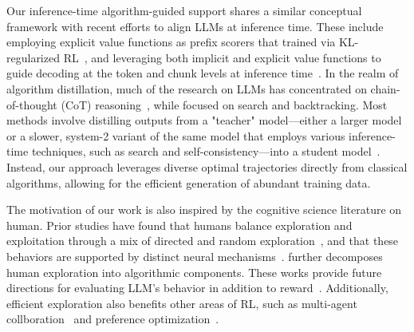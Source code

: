Our inference-time algorithm-guided support shares a similar conceptual framework with recent efforts to align LLMs at inference time. These include employing explicit value functions as prefix scorers that trained via KL-regularized RL~\citep{mudgal2023controlled}, and leveraging both implicit and explicit value functions to guide decoding at the token and chunk levels at inference time~\citep{liu2024inference}. 
In the realm of algorithm distillation, much of the research on LLMs has concentrated on chain-of-thought (CoT) reasoning~\citep{wang2023scott, li2023symbolic}, while \cite{gandhi2024stream} focused on search and backtracking. Most methods involve distilling outputs from a "teacher" model—either a larger model or a slower, system-2 variant of the same model that employs various inference-time techniques, such as search and self-consistency—into a student model~\citep{yu2024distilling}. Instead, our approach leverages diverse optimal trajectories directly from classical algorithms, allowing for the efficient generation of abundant training data.

The motivation of our work is also inspired by the cognitive science literature on human. Prior studies have found that humans balance exploration and exploitation through a mix of directed and random exploration~\citep{wilson2014humans}, and that these behaviors are supported by distinct neural mechanisms~\citep{daw2006cortical}. \citet{gershman2018deconstructing} further decomposes human exploration into algorithmic components. These works provide future directions for evaluating LLM's behavior in addition to reward~\cite{pan2025large}. Additionally, efficient exploration also benefits other areas of RL, such as multi-agent collboration~\citep{qu2024choices} and preference optimization~\citep{bai2025online}.

